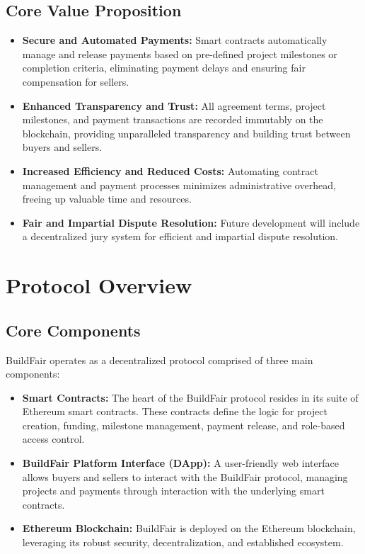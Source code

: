 \documentclass[12pt]{article}
\begin{document}
\subsection{Core Value Proposition}
\begin{itemize}
    \item \textbf{Secure and Automated Payments:} Smart contracts automatically manage and release payments based on pre-defined project milestones or completion criteria, eliminating payment delays\cite{construction_standards} and ensuring fair compensation for sellers.
    \item \textbf{Enhanced Transparency and Trust:} All agreement terms, project milestones, and payment transactions are recorded immutably on the blockchain\cite{ethereum_yellow}, providing unparalleled transparency and building trust between buyers and sellers.
    \item \textbf{Increased Efficiency and Reduced Costs:} Automating contract management and payment processes minimizes administrative overhead, freeing up valuable time and resources\cite{european_market_report}.
    \item \textbf{Fair and Impartial Dispute Resolution:} Future development will include a decentralized jury system for efficient and impartial dispute resolution.
\end{itemize}

\section{Protocol Overview}
\subsection{Core Components}
BuildFair operates as a decentralized protocol comprised of three main components:

\begin{itemize}
    \item \textbf{Smart Contracts:} The heart of the BuildFair protocol resides in its suite of Ethereum smart contracts. These contracts define the logic for project creation, funding, milestone management, payment release, and role-based access control.
    \item \textbf{BuildFair Platform Interface (DApp):} A user-friendly web interface allows buyers and sellers to interact with the BuildFair protocol, managing projects and payments through interaction with the underlying smart contracts.
    \item \textbf{Ethereum Blockchain:} BuildFair is deployed on the Ethereum blockchain, leveraging its robust security, decentralization, and established ecosystem.
\end{itemize}
\end{document}

